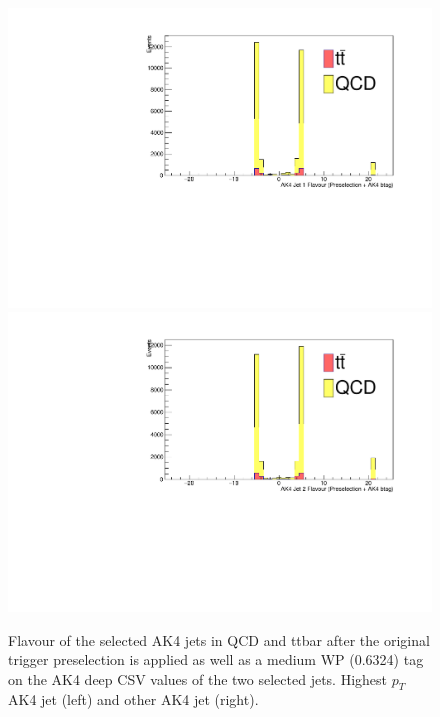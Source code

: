 \begin{figure}[thb!]
\begin{center}
\includegraphics[scale=0.35]{Figures/checkpreflavAK1PSM.pdf}
\includegraphics[scale=0.35]{Figures/checkpreflavAK2PSM.pdf}
\end{center}
\caption{Flavour of the selected AK4 jets in QCD and ttbar after the original trigger preselection is applied as well as a medium WP (0.6324) tag on the AK4 deep CSV values of the two selected jets. Highest $p_{T}$ AK4 jet (left) and other AK4 jet (right).}
\label{fig:flav2}
\end{figure}


